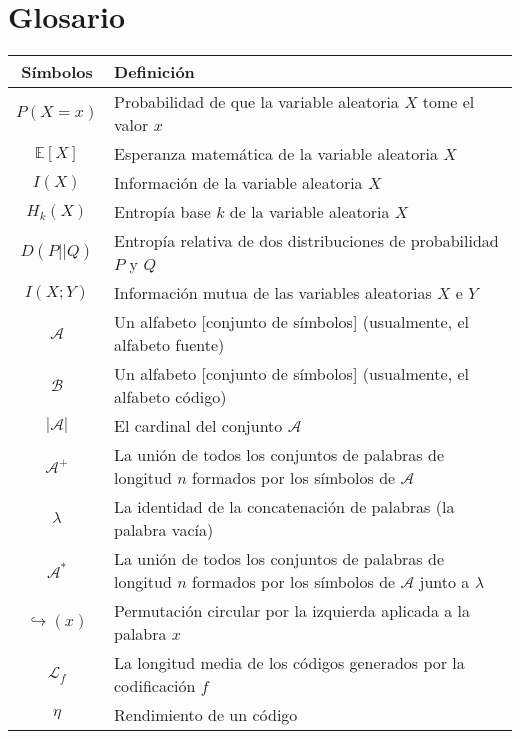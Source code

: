 \section{Glosario}

\begin{table}[htbp!]
\begin{tabular}{|c|p{9cm}|}
\hline
\textbf{Símbolos} & \textbf{Definición} \\
\hline
$P(X=x)$ & Probabilidad de que la variable aleatoria $X$ tome el valor $x$ \\
$\mathbb{E}[X]$ & Esperanza matemática de la variable aleatoria $X$\\
$I(X)$ & Información de la variable aleatoria $X$\\
$H_k(X)$ & Entropía base $k$ de la variable aleatoria $X$\\
$D(P||Q)$ & Entropía relativa de dos distribuciones de probabilidad $P$ y $Q$\\
$I(X;Y)$ & Información mutua de las variables aleatorias $X$ e $Y$\\
$\mathcal{A}$ & Un alfabeto [conjunto de símbolos] (usualmente, el alfabeto fuente)\\
$\mathcal{B}$ & Un alfabeto [conjunto de símbolos] (usualmente, el alfabeto código)\\
$\left|\mathcal{A}\right|$ & El cardinal del conjunto $\mathcal{A}$\\
$\mathcal{A}^+$ & La unión de todos los conjuntos de palabras de longitud $n$ formados por los símbolos de $\mathcal{A}$\\
$\lambda$ & La identidad de la concatenación de palabras (la palabra vacía)\\
$\mathcal{A}^*$ & La unión de todos los conjuntos de palabras de longitud $n$ formados por los símbolos de $\mathcal{A}$ junto a $\lambda$\\
$\hookrightarrow(x)$ & Permutación circular por la izquierda aplicada a la palabra $x$\\
$\mathcal{L}_f$ & La longitud media de los códigos generados por la codificación $f$\\
$\eta$ & Rendimiento de un código\\
\hline
\end{tabular}
\end{table}